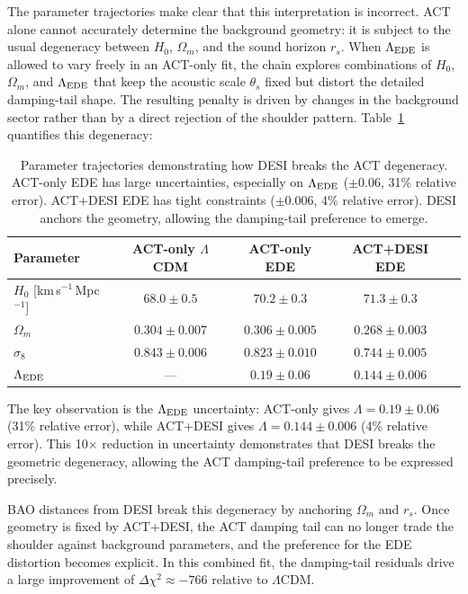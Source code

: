 \documentclass[twocolumn,showpacs,preprintnumbers,amsmath,amssymb,prd]{revtex4-2}
\newcommand{\lcdm}{$\Lambda$CDM}
\newcommand{\kms}{km\,s$^{-1}$\,Mpc$^{-1}$}
\begin{document}
The parameter trajectories make clear that this interpretation is incorrect. 
ACT alone cannot accurately determine the background geometry: it is subject 
to the usual degeneracy between $H_0$, $\Omega_m$, and the sound horizon $r_s$. 
When $\Lambda_{\rm EDE}$ is allowed to vary freely in an ACT-only fit, the chain 
explores combinations of $H_0$, $\Omega_m$, and $\Lambda_{\rm EDE}$ that keep 
the acoustic scale $\theta_s$ fixed but distort the detailed damping-tail shape. 
The resulting penalty is driven by changes in the background sector rather than 
by a direct rejection of the shoulder pattern. Table~\ref{tab:param_trajectory} 
quantifies this degeneracy:

\begin{table}[h]
\centering
\caption{Parameter trajectories demonstrating how DESI breaks the ACT degeneracy. 
ACT-only EDE has large uncertainties, especially on $\Lambda_{\rm EDE}$ ($\pm 0.06$, 
31\% relative error). ACT+DESI EDE has tight constraints ($\pm 0.006$, 4\% relative 
error). DESI anchors the geometry, allowing the damping-tail preference to emerge.}
\label{tab:param_trajectory}
\begin{tabular}{lcccc}
\toprule
Parameter & ACT-only \lcdm & ACT-only EDE & ACT+DESI EDE \\
\midrule
$H_0$ [\kms] & $68.0 \pm 0.5$ & $70.2 \pm 0.3$ & $71.3 \pm 0.3$ \\
$\Omega_m$ & $0.304 \pm 0.007$ & $0.306 \pm 0.005$ & $0.268 \pm 0.003$ \\
$\sigma_8$ & $0.843 \pm 0.006$ & $0.823 \pm 0.010$ & $0.744 \pm 0.005$ \\
$\Lambda_{\rm EDE}$ & --- & $0.19 \pm 0.06$ & $0.144 \pm 0.006$ \\
\bottomrule
\end{tabular}
\end{table}

The key observation is the $\Lambda_{\rm EDE}$ uncertainty: ACT-only gives 
$\Lambda = 0.19 \pm 0.06$ (31\% relative error), while ACT+DESI gives 
$\Lambda = 0.144 \pm 0.006$ (4\% relative error). This 10$\times$ reduction 
in uncertainty demonstrates that DESI breaks the geometric degeneracy, 
allowing the ACT damping-tail preference to be expressed precisely.

BAO distances from DESI break this degeneracy by anchoring $\Omega_m$ and $r_s$. 
Once geometry is fixed by ACT+DESI, the ACT damping tail can no longer trade 
the shoulder against background parameters, and the preference for the EDE 
distortion becomes explicit. In this combined fit, the damping-tail residuals 
drive a large improvement of $\Delta\chi^2 \approx -766$ relative to \lcdm.
\end{document}
